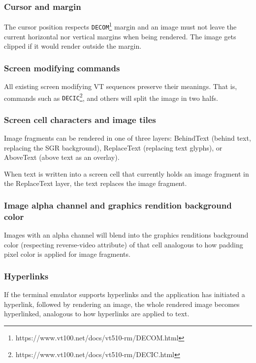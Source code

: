 \documentclass[a4paper]{article}
\newcommand{\code}[1]{\colorbox{light-gray}{\texttt{#1}}}
\begin{document}
\subsubsection*{Cursor and margin}

The cursor position respects
\code{DECOM}\footnote{https://www.vt100.net/docs/vt510-rm/DECOM.html}
margin and an image must not leave the current horizontal nor vertical margins
when being rendered.
The image gets clipped if it would render outside the margin.

\subsubsection*{Screen modifying commands}

All existing screen modifying VT sequences preserve their meanings.
That is, commands such as
\code{DECIC}\footnote{https://www.vt100.net/docs/vt510-rm/DECIC.html},
and others will split the image in two halfs.

\subsubsection*{Screen cell characters and image tiles}

Image fragments can be rendered in one of three layers:
BehindText (behind text, replacing the SGR background),
ReplaceText (replacing text glyphs),
or AboveText (above text as an overlay).

When text is written into a screen cell that currently holds
an image fragment in the ReplaceText layer,
the text replaces the image fragment.

\subsubsection*{Image alpha channel and graphics rendition background color}

Images with an alpha channel will blend into the graphics renditions
background color (respecting reverse-video attribute) of that cell analogous
to how padding pixel color is applied for image fragments.

\subsubsection*{Hyperlinks}

If the terminal emulator supports hyperlinks and the application has initiated
a hyperlink, followed by rendering an image, the whole rendered image becomes
hyperlinked, analogous to how hyperlinks are applied to text.
\end{document}
